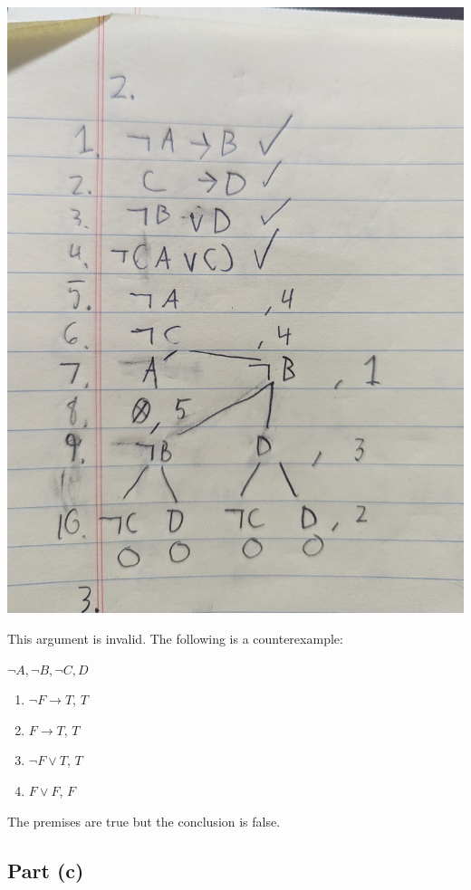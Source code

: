 \documentclass[12pt]{article}
\begin{document}
\includegraphics[width=\textwidth]{1b}

This argument is invalid. The following is a counterexample:

$\lnot A, \lnot B, \lnot C, D$

\begin{enumerate}
    \item $\lnot F \rightarrow T$, $T$ 
    \item $F \rightarrow T$, $T$
    \item $\lnot F \lor T$, $T$
    \item $F \lor F$, $F$
\end{enumerate}

The premises are true but the conclusion is false.

\subsection*{Part (c)}
\end{document}
